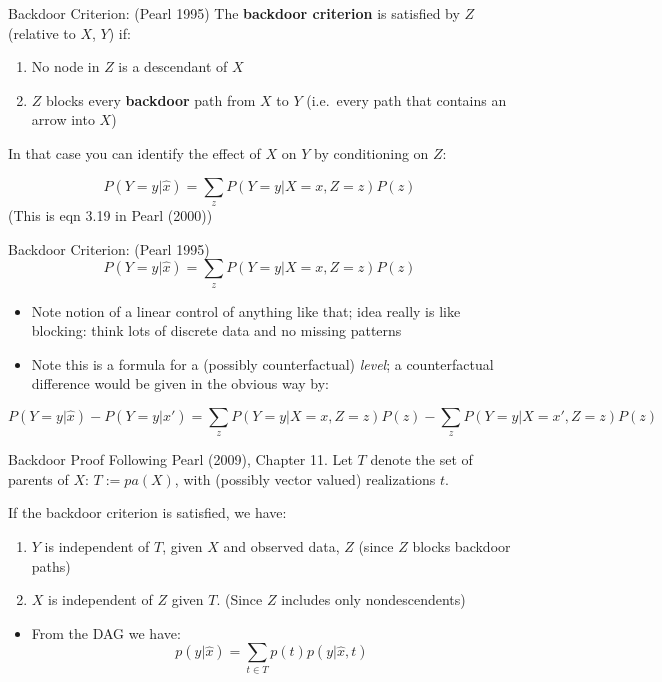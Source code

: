 \documentclass[
  11pt,
  ignorenonframetext,
]{beamer}
\providecommand{\tightlist}{%
  \setlength{\itemsep}{0pt}\setlength{\parskip}{0pt}}\usepackage{longtable,booktabs,array}
\begin{document}
\begin{frame}{Backdoor Criterion: (Pearl 1995)}
\protect\hypertarget{backdoor-criterion-pearl-1995}{}
The \textbf{backdoor criterion} is satisfied by \(Z\) (relative to
\(X\), \(Y\)) if:

\begin{enumerate}
\tightlist
\item
  No node in \(Z\) is a descendant of \(X\)
\item
  \(Z\) blocks every \textbf{backdoor} path from \(X\) to \(Y\)
  (i.e.~every path that contains an arrow into \(X\))
\end{enumerate}

In that case you can identify the effect of \(X\) on \(Y\) by
conditioning on \(Z\):

\[P(Y=y | \hat{x}) = \sum_z P(Y=y| X = x, Z=z)P(z)\] (This is eqn 3.19
in Pearl (2000))
\end{frame}

\begin{frame}{Backdoor Criterion: (Pearl 1995)}
\protect\hypertarget{backdoor-criterion-pearl-1995-1}{}
\[P(Y=y | \hat{x}) = \sum_z P(Y=y| X = x, Z=z)P(z)\]

\begin{itemize}
\tightlist
\item
  Note notion of a linear control of anything like that; idea really is
  like blocking: think lots of discrete data and no missing patterns
\item
  Note this is a formula for a (possibly counterfactual) \emph{level}; a
  counterfactual difference would be given in the obvious way by:
\end{itemize}

\[P(Y=y | \hat{x}) - P(Y=y | \hat{x}') = \sum_z P(Y=y| X = x, Z=z)P(z) - \sum_z P(Y=y| X = x', Z=z)P(z)\]
\end{frame}

\begin{frame}{Backdoor Proof}
\protect\hypertarget{backdoor-proof}{}
Following Pearl (2009), Chapter 11. Let \(T\) denote the set of parents
of \(X\): \(T := pa(X)\), with (possibly vector valued) realizations
\(t\).

If the backdoor criterion is satisfied, we have:

\begin{enumerate}
\tightlist
\item
  \(Y\) is independent of \(T\), given \(X\) and observed data, \(Z\)
  (since \(Z\) blocks backdoor paths)
\item
  \(X\) is independent of \(Z\) given \(T\). (Since \(Z\) includes only
  nondescendents)
\end{enumerate}

\begin{itemize}
\tightlist
\item
  From the DAG we have:
  \[p(y|\hat{x}) = \sum_{t\in T} p(t)p(y|\hat{x}, t)\]
\end{itemize}
\end{frame}
\end{document}
